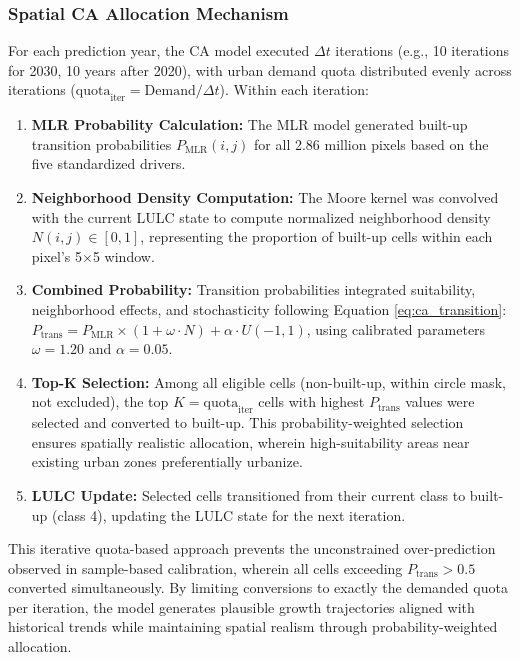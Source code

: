 \documentclass[conference]{IEEEtran}
\begin{document}
\subsubsection{Spatial CA Allocation Mechanism}

For each prediction year, the CA model executed $\Delta t$ iterations (e.g., 10 iterations for 2030, 10 years after 2020), with urban demand quota distributed evenly across iterations ($\text{quota}_{\text{iter}} = \text{Demand} / \Delta t$). Within each iteration:

\begin{enumerate}
\item \textbf{MLR Probability Calculation:} The MLR model generated built-up transition probabilities $P_{\text{MLR}}(i,j)$ for all 2.86 million pixels based on the five standardized drivers.

\item \textbf{Neighborhood Density Computation:} The Moore kernel was convolved with the current LULC state to compute normalized neighborhood density $N(i,j) \in [0,1]$, representing the proportion of built-up cells within each pixel's 5$\times$5 window.

\item \textbf{Combined Probability:} Transition probabilities integrated suitability, neighborhood effects, and stochasticity following Equation \ref{eq:ca_transition}: $P_{\text{trans}} = P_{\text{MLR}} \times (1 + \omega \cdot N) + \alpha \cdot U(-1,1)$, using calibrated parameters $\omega=1.20$ and $\alpha=0.05$.

\item \textbf{Top-K Selection:} Among all eligible cells (non-built-up, within circle mask, not excluded), the top $K = \text{quota}_{\text{iter}}$ cells with highest $P_{\text{trans}}$ values were selected and converted to built-up. This probability-weighted selection ensures spatially realistic allocation, wherein high-suitability areas near existing urban zones preferentially urbanize.

\item \textbf{LULC Update:} Selected cells transitioned from their current class to built-up (class 4), updating the LULC state for the next iteration.
\end{enumerate}

This iterative quota-based approach prevents the unconstrained over-prediction observed in sample-based calibration, wherein all cells exceeding $P_{\text{trans}} > 0.5$ converted simultaneously. By limiting conversions to exactly the demanded quota per iteration, the model generates plausible growth trajectories aligned with historical trends while maintaining spatial realism through probability-weighted allocation.
\end{document}

